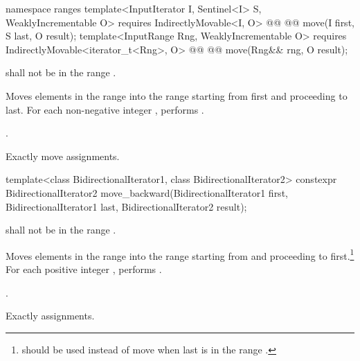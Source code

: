 \begin{addedblock}
%
\begin{itemdecl}
namespace ranges {
  template<InputIterator I, Sentinel<I> S, WeaklyIncrementable O>
    requires IndirectlyMovable<I, O>
    @@
    @@
      move(I first, S last, O result);
  template<InputRange Rng, WeaklyIncrementable O>
    requires IndirectlyMovable<iterator_t<Rng>, O>
    @@
    @@
      move(Rng&& rng, O result);
}
\end{itemdecl}

\begin{itemdescr}
\pnum
\requires
{}
shall not be in the range
.

\pnum
\effects
Moves elements in the range 
into the range 
starting from first and proceeding to last.
For each non-negative integer
,
performs
.

\pnum
\returns
{}.

\pnum
\complexity
Exactly
move assignments.
\end{itemdescr}
\end{addedblock}

%
\begin{itemdecl}
template<class BidirectionalIterator1, class BidirectionalIterator2>
  constexpr BidirectionalIterator2
    move_backward(BidirectionalIterator1 first, BidirectionalIterator1 last,
                  BidirectionalIterator2 result);
\end{itemdecl}

\begin{itemdescr}
\pnum
\requires
{}
shall not be in the range
.

\pnum
\effects
Moves elements in the range 
into the
range 
starting from
and proceeding to first.\footnote{
should be used instead of move when last
is in
the range
.}
For each positive integer
,
performs
.

\pnum
\returns
{}.

\pnum
\complexity
Exactly
assignments.
\end{itemdescr}

